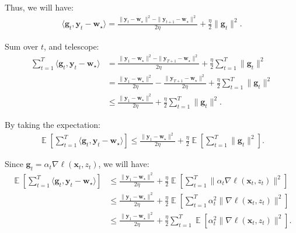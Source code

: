 \documentclass[letterpaper]{article}
\newcommand{\E}{\mathop{\mathbb{E}}}
\newcommand{\bx}{\mathbf{x}}
\newcommand{\by}{\mathbf{y}}
\newcommand{\bw}{\mathbf{w}}
\newcommand{\bg}{\mathbf{g}}
\begin{document}
\begin{enumerate}
Thus, we will have:
\begin{equation}
	\begin{aligned}
		\langle \bg_t, \by_t -\bw_\star\rangle = \frac{\| \by_t - \bw_\star \|^2 - \| \by_{t+1} -\bw_\star \|^2}{2\eta} + \frac{\eta}{2} \| \bg_t \|^2.
	\end{aligned}
\end{equation}

Sum over $t$, and telescope:
\begin{equation}
	\begin{aligned}
		\sum_{t=1}^T \langle \bg_t, \by_t -\bw_\star\rangle &= \frac{\| \by_1 - \bw_\star \|^2 - \| \by_{T+1} -\bw_\star \|^2}{2\eta} + \frac{\eta}{2} \sum_{t=1}^T \| \bg_t \|^2\\
		& = \frac{\| \by_1 - \bw_\star \|^2}{2\eta} - \frac{\| \by_{T+1} -\bw_\star \|^2}{2\eta} + \frac{\eta}{2} \sum_{t=1}^T \| \bg_t \|^2\\
		& \le \frac{\| \by_1 - \bw_\star \|^2}{2\eta} + \frac{\eta}{2} \sum_{t=1}^T \| \bg_t \|^2.
	\end{aligned}
\end{equation}

By taking the expectation:
\begin{equation}
	\begin{aligned}
		\E\left[\sum_{t=1}^T \langle \bg_t, \by_t -\bw_\star\rangle\right]  \le \frac{\| \by_1 - \bw_\star \|^2}{2\eta} + \frac{\eta}{2} \E\left[\sum_{t=1}^T \| \bg_t \|^2\right].
	\end{aligned}
\end{equation}

Since $\bg_t = \alpha_t \nabla \ell(\bx_t, z_t)$, we will have:
\begin{equation}
	\begin{aligned}
		\E\left[\sum_{t=1}^T \langle \bg_t, \by_t -\bw_\star\rangle\right]  &\le \frac{\| \by_1 - \bw_\star \|^2}{2\eta} + \frac{\eta}{2} \E\left[ \sum_{t=1}^T \| \alpha_t \nabla \ell(\bx_t, z_t) \|^2\right]\\
		& \le \frac{\| \by_1 - \bw_\star \|^2}{2\eta} + \frac{\eta}{2} \E\left[\sum_{t=1}^T \alpha_t^2 \| \nabla \ell(\bx_t, z_t) \|^2\right]\\
		& \le \frac{\| \by_1 - \bw_\star \|^2}{2\eta} + \frac{\eta}{2} \sum_{t=1}^T \E\left[\alpha_t^2 \| \nabla \ell(\bx_t, z_t) \|^2\right].
	\end{aligned}
\end{equation}


\end{enumerate}
\end{document}

